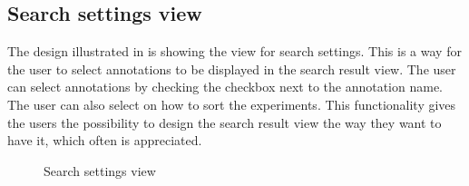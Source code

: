 \subsection{Search settings view}
The design illustrated in  is showing the view for search settings. 
This is a way for the user to select annotations to be displayed in the search result view.
The user can select annotations by checking the checkbox next to the annotation name.
The user can also select on how to sort the experiments.
This functionality gives the users the possibility to design the search result view the way they want to have it, which often is appreciated. 

\begin{figure}[ht]
\caption{Search settings view}
\label{fig:and_search_settings}
\end{figure}
\FloatBarrier
